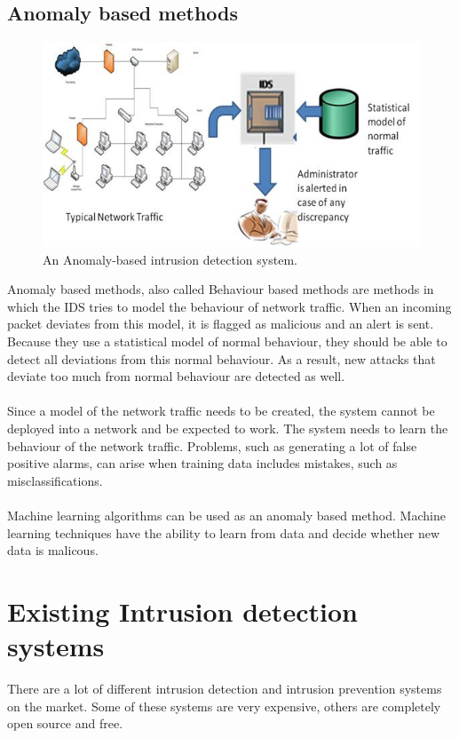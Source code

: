 \subsection{Anomaly based methods}
\begin{figure}[H]
\centering
\includegraphics[width=1\textwidth]{Figures/Anomaly-based-Intrusion-Detection-System}
\decoRule
\caption[Anomaly based IDS]{An Anomaly-based intrusion detection system. \cite{snortImg}}
\label{fig:Anomaly}
\end{figure}
\noindent Anomaly based methods, also called Behaviour based methods are methods in which the IDS tries to model the behaviour of network traffic. When an incoming packet deviates from this model, it is flagged as malicious and an alert is sent. Because they use a statistical model of normal behaviour, they should be able to detect all deviations from this normal behaviour. As a result, new attacks that deviate too much from normal behaviour are detected as well. \cite{snortImg} \\
\\
Since a model of the network traffic needs to be created, the system cannot be deployed into a network and be expected to work. The system needs to learn the behaviour of the network traffic. Problems, such as generating a lot of false positive alarms, can arise when training data includes mistakes, such as misclassifications. \\
\\
Machine learning algorithms can be used as an anomaly based method. Machine learning techniques have the ability to learn from data and decide whether new data is malicous. \cite{snortImg}

\section{Existing Intrusion detection systems}
There are a lot of different intrusion detection and intrusion prevention systems on the market. Some of these systems are very expensive, others are completely open source and free. 

